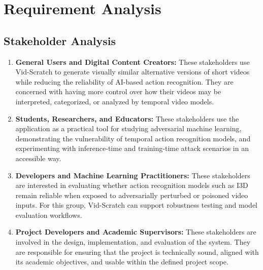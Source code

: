 
\newcommand{\userstory}[4]{%
    \refstepcounter{nuserstory}
    \subsection{#1}
    \label{userstory:\thenuserstory}
    \hangindent=40pt
    \textbf{\textit{As a}} #2,\\
    \textbf{\textit{I want to}} #3,\\
    \textbf{\textit{so that}} #4.
}
\newenvironment{usecase}[1]
{
    \refstepcounter{nusecase}%
    \subsection{Use Case \thenusecase: #1}%
    \label{usecase:\thenusecase}%
}{}

\chapter{Requirement Analysis}
\label{chap:requirement-analysis}

\section{Stakeholder Analysis}
\label{section:stakeholder-analysis}

\begin{enumerate}[leftmargin=80pt]
    \item \textbf{General Users and Digital Content Creators:} These stakeholders use Vid-Scratch to generate visually similar alternative versions of short videos while reducing the reliability of AI-based action recognition. They are concerned with having more control over how their videos may be interpreted, categorized, or analyzed by temporal video models.

    \item \textbf{Students, Researchers, and Educators:} These stakeholders use the application as a practical tool for studying adversarial machine learning, demonstrating the vulnerability of temporal action recognition models, and experimenting with inference-time and training-time attack scenarios in an accessible way.

    \item \textbf{Developers and Machine Learning Practitioners:} These stakeholders are interested in evaluating whether action recognition models such as I3D remain reliable when exposed to adversarially perturbed or poisoned video inputs. For this group, Vid-Scratch can support robustness testing and model evaluation workflows.

    \item \textbf{Project Developers and Academic Supervisors:} These stakeholders are involved in the design, implementation, and evaluation of the system. They are responsible for ensuring that the project is technically sound, aligned with its academic objectives, and usable within the defined project scope.
\end{enumerate}
